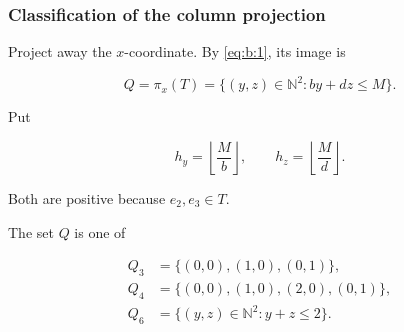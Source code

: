 \subsubsection{Classification of the column projection}

Project away the \(x\)-coordinate. By \eqref{eq:b:1}, its image is

\begin{equation}
Q=\pi_x(T)
=\{(y,z)\in\mathbb N^2:by+dz\le M\}.
\label{eq:b:2}
\end{equation}

Put

\[
h_y=\left\lfloor\frac Mb\right\rfloor,
\qquad
h_z=\left\lfloor\frac Md\right\rfloor.
\]

Both are positive because \(e_2,e_3\in T\).

\begin{lemma}\label{lemma:b:2.1}

The set \(Q\) is one of

\begin{equation}
\begin{aligned}
Q_3&=\{(0,0),(1,0),(0,1)\},\\
Q_4&=\{(0,0),(1,0),(2,0),(0,1)\},\\
Q_6&=\{(y,z)\in\mathbb N^2:y+z\le2\}.
\end{aligned}
\label{eq:b:3}
\end{equation}

\end{lemma}
